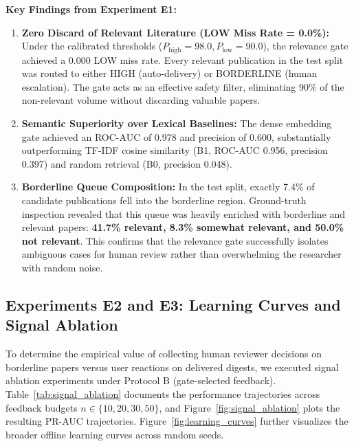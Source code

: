 \noindent\textbf{Key Findings from Experiment E1:}
\begin{enumerate}
    \item \textbf{Zero Discard of Relevant Literature (LOW Miss Rate = 0.0\%):} Under the calibrated thresholds ($P_{\text{high}}=98.0, P_{\text{low}}=90.0$), the relevance gate achieved a 0.000 LOW miss rate. Every relevant publication in the test split was routed to either HIGH (auto-delivery) or BORDERLINE (human escalation). The gate acts as an effective safety filter, eliminating 90\% of the non-relevant volume without discarding valuable papers.
    \item \textbf{Semantic Superiority over Lexical Baselines:} The dense embedding gate achieved an ROC-AUC of 0.978 and precision of 0.600, substantially outperforming TF-IDF cosine similarity (B1, ROC-AUC 0.956, precision 0.397) and random retrieval (B0, precision 0.048).
    \item \textbf{Borderline Queue Composition:} In the test split, exactly 7.4\% of candidate publications fell into the borderline region. Ground-truth inspection revealed that this queue was heavily enriched with borderline and relevant papers: \textbf{41.7\% relevant, 8.3\% somewhat relevant, and 50.0\% not relevant}. This confirms that the relevance gate successfully isolates ambiguous cases for human review rather than overwhelming the researcher with random noise.
\end{enumerate}

\subsection{Experiments E2 and E3: Learning Curves and Signal Ablation}
\label{sec:exp_e2_e3}

To determine the empirical value of collecting human reviewer decisions on borderline papers versus user reactions on delivered digests, we executed signal ablation experiments under Protocol B (gate-selected feedback). Table~\ref{tab:signal_ablation} documents the performance trajectories across feedback budgets $n \in \{10, 20, 30, 50\}$, and Figure~\ref{fig:signal_ablation} plots the resulting PR-AUC trajectories. Figure~\ref{fig:learning_curves} further visualizes the broader offline learning curves across random seeds.

